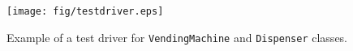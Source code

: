 \begin{figure}[!ht]
\begin{center}
\texttt{[image: fig/testdriver.eps]}
\caption{\label{fig:drv}Example of a test driver for
\texttt{VendingMachine} and \texttt{Dispenser} classes.}
\end{center}
\end{figure}
